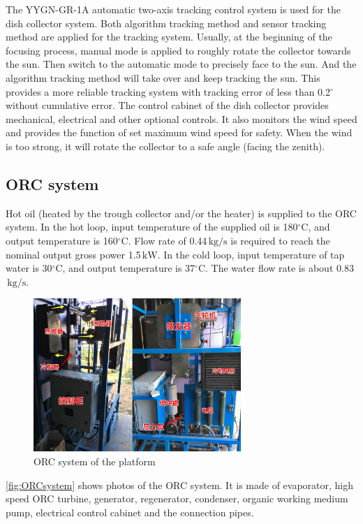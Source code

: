 The YYGN-GR-1A automatic two-axis tracking control system is used for the dish collector system. Both algorithm tracking method and sensor tracking method are applied for the tracking system. Usually, at the beginning of the focusing process, manual mode is applied to roughly rotate the collector towards the sun. Then switch to the automatic mode to precisely face to the sun. And the algorithm tracking method will take over and keep tracking the sun. This provides a more reliable tracking system with tracking error of less than 0.2$^\circ$ without cumulative error.
The control cabinet of the dish collector provides mechanical, electrical and other optional controls. It also monitors the wind speed and provides the function of set maximum wind speed for safety. When the wind is too strong, it will rotate the collector to a safe angle (facing the zenith).

\subsection{ORC system}
Hot oil (heated by the trough collector and/or the heater) is supplied to the ORC system. 
In the hot loop, input temperature of the supplied oil is 180$\mathrm{^\circ C}$, and output temperature is 160$\mathrm{^\circ C}$. Flow rate of 0.44$\,\mathrm{kg/s}$ is required to reach the nominal output gross power 1.5$\,\mathrm{kW}$. In the cold loop, input temperature of tap water is 30$\mathrm{^\circ C}$, and output temperature is 37$\mathrm{^\circ C}$. The water flow rate is about 0.83$\,\mathrm{kg/s}$.

\begin{figure}[!ht]
\centering
\includegraphics[width=0.7\textwidth]{fig/ORCsystem.jpg}
\caption{ORC system of the platform}\label{fig:ORCsystem}
\end{figure}
\autoref{fig:ORCsystem} shows photos of the ORC system. It is made of evaporator, high speed ORC turbine, generator, regenerator, condenser, organic working medium pump, electrical control cabinet and the connection pipes.

